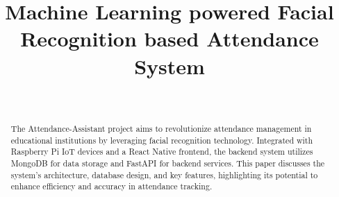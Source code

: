 \documentclass[conference]{IEEEtran}
\begin{document}
\title{Machine Learning powered Facial Recognition based Attendance System\\
}
\author{
    \\

    \and

    \and
    \and
}

\maketitle

\begin{abstract}
    The Attendance-Assistant project aims to revolutionize attendance management in educational institutions by leveraging facial recognition technology. Integrated with Raspberry Pi IoT devices and a React Native frontend, the backend system utilizes MongoDB for data storage and FastAPI for backend services. This paper discusses the system's architecture, database design, and key features, highlighting its potential to enhance efficiency and accuracy in attendance tracking.\\
\end{abstract}
\end{document}
